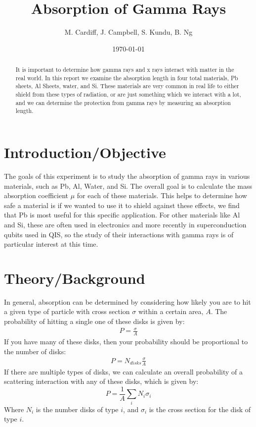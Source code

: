 \documentclass[letterpaper,12pt]{article}
\begin{document}
\title{Absorption of Gamma Rays}
\author{M. Cardiff, J. Campbell, S. Kundu, B. Ng}
\date{\today}
\maketitle

\begin{abstract}
  It is important to determine how gamma rays and x rays interact with matter in the real world. In this report we examine the absorption length in four total materials, Pb sheets, Al Sheets, water, and Si. These materials are very common in real life to either shield from these types of radiation, or are just something which we interact with a lot, and we can determine the protection from gamma rays by measuring an absorption length. 
\end{abstract}
\section{Introduction/Objective}
The goals of this experiment is to study the absorption of gamma rays in various materials, such as Pb, Al, Water, and Si. The overall goal is to calculate the mass absorption coefficient $\mu$ for each of these materials. This helps to determine how safe a material is if we wanted to use it to shield against these effects, we find that Pb is most useful for this specific application. For other materials like Al and Si, these are often used in electronics and more recently in superconduction qubits used in QIS, so the study of their interactions with gamma rays is of particular interest at this time. 

\section{Theory/Background}
In general, absorption can be determined by considering how likely you are to hit a given type of particle with cross section $\sigma$ within a certain area, $A$. The probability of hitting a single one of these disks is given by:
\begin{align*}
  P=\frac{\sigma}{A}
\end{align*}
If you have many of these disks, then your probability should be proportional to the number of disks:
\begin{align*}
  P=N_{disks}\frac{\sigma}{A}
\end{align*}
If there are multiple types of disks, we can calculate an overall probability of a scattering interaction with any of these disks, which is given by:
\begin{equation}
  \label{eq:xmission}
  P=\frac{1}{A}\sum_{i}N_{i}\sigma_i
\end{equation}
Where $N_i$ is the number disks of type $i$, and $\sigma_i$ is the cross section for the disk of type $i$.
\end{document}
